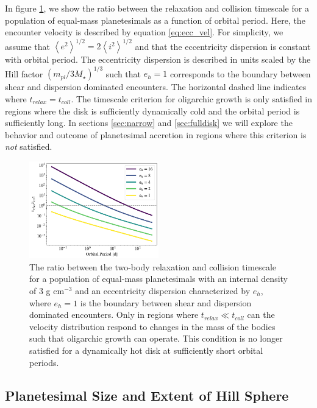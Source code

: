 \documentclass[twocolumn]{aastex63}
\begin{document}
In figure \ref{fig:timescales}, we show the ratio between the relaxation
and collision timescale for a population of equal-mass planetesimals
as a function of orbital period. Here, the encounter velocity is
described by equation \ref{eq:ecc_vel}. For
simplicity, we assume that $\left< e^2 \right>^{1/2} = 2\left< i^2
\right>^{1/2}$ \citep{ida93a} and that the eccentricity dispersion is
constant with orbital period. The eccentricity dispersion is described
in units scaled by the Hill factor $\left( m_{pl}/ 3 M_{\star}
\right)^{1/3}$ such that $e_{h} = 1$ corresponds to the boundary
between shear and dispersion dominated encounters. The horizontal
dashed line indicates where $t_{relax} = t_{coll}$. The timescale
criterion for oligarchic growth is only satisfied in regions where the
disk is sufficiently dynamically cold and the orbital period is
sufficiently long. In sections \ref{sec:narrow} and \ref{sec:fulldisk}
we will explore the behavior and outcome of planetesimal accretion in regions where this criterion is \textit{not} satisfied. 

\begin{figure}
\begin{center}
    \includegraphics[width=0.5\textwidth]{figures/timescales.png}
    \caption{The ratio between the two-body relaxation and collision
      timescale for a population of equal-mass planetesimals with an
      internal density of 3 g cm$^{-3}$ and an eccentricity dispersion
      characterized by $e_h$, where $e_h = 1$ is the boundary between
      shear and dispersion dominated encounters. Only in regions where $t_{relax} \ll t_{coll}$ can the velocity distribution respond to changes in the mass of the bodies such that oligarchic growth can operate. This condition is no longer satisfied for a dynamically hot disk at sufficiently short orbital periods.\label{fig:timescales}}
\end{center}
\end{figure}

\subsection{Planetesimal Size and Extent of Hill Sphere}\label{sec:sizeandhill}
\end{document}
